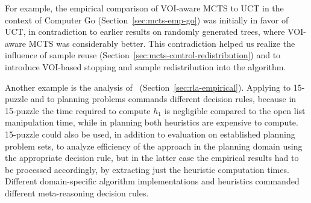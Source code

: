 For example, the empirical comparison of VOI-aware MCTS
to UCT in the context of Computer Go (Section~\ref{sec:mcts-emp-go})
was initially in favor of UCT, in contradiction to earlier results
on randomly generated trees, where VOI-aware MCTS was considerably
better. This contradiction helped us realize the influence of sample
reuse (Section~\ref{sec:mcts-control-redistribution}) and
to introduce VOI-based stopping and sample redistribution into the
algorithm.

Another example is the analysis of
\rationallazyastar~(Section~\ref{sec:rla-empirical}). Applying
\rationallazyastar to 15-puzzle and to planning problems commands
different decision rules, because in 15-puzzle the time required to
compute $h_1$ is negligible compared to the open list manipulation time,
while in planning both heuristics are expensive to compute. 15-puzzle
could also be used, in addition to evaluation on established planning
problem sets, to analyze efficiency of the approach  in the
planning domain using the appropriate decision rule, but in the latter
case the empirical results had to be processed accordingly,
by extracting just the heuristic computation times. Different
domain-specific algorithm implementations and heuristics commanded
different meta-reasoning decision rules.
